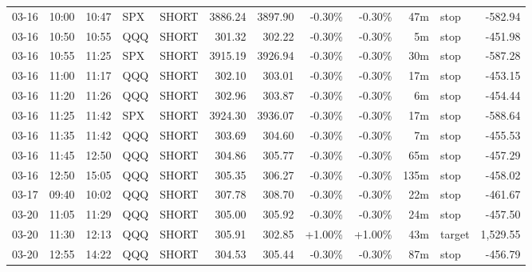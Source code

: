 \documentclass[11pt,a4paper,twoside]{article}
\begin{document}
\begin{center}
\begin{longtable}{>{\color{txtmain}}l l l l l r r r r r >{\color{txtmain}}l r}
03-16 & 10:00 & 10:47 & SPX & SHORT & 3886.24 & 3897.90 & \textcolor{lossred}{-0.30\%} & \textcolor{lossred}{-0.30\%} & 47m & stop & \textcolor{lossred}{-582.94} \\
03-16 & 10:50 & 10:55 & QQQ & SHORT & 301.32 & 302.22 & \textcolor{lossred}{-0.30\%} & \textcolor{lossred}{-0.30\%} & 5m & stop & \textcolor{lossred}{-451.98} \\
03-16 & 10:55 & 11:25 & SPX & SHORT & 3915.19 & 3926.94 & \textcolor{lossred}{-0.30\%} & \textcolor{lossred}{-0.30\%} & 30m & stop & \textcolor{lossred}{-587.28} \\
03-16 & 11:00 & 11:17 & QQQ & SHORT & 302.10 & 303.01 & \textcolor{lossred}{-0.30\%} & \textcolor{lossred}{-0.30\%} & 17m & stop & \textcolor{lossred}{-453.15} \\
03-16 & 11:20 & 11:26 & QQQ & SHORT & 302.96 & 303.87 & \textcolor{lossred}{-0.30\%} & \textcolor{lossred}{-0.30\%} & 6m & stop & \textcolor{lossred}{-454.44} \\
03-16 & 11:25 & 11:42 & SPX & SHORT & 3924.30 & 3936.07 & \textcolor{lossred}{-0.30\%} & \textcolor{lossred}{-0.30\%} & 17m & stop & \textcolor{lossred}{-588.64} \\
03-16 & 11:35 & 11:42 & QQQ & SHORT & 303.69 & 304.60 & \textcolor{lossred}{-0.30\%} & \textcolor{lossred}{-0.30\%} & 7m & stop & \textcolor{lossred}{-455.53} \\
03-16 & 11:45 & 12:50 & QQQ & SHORT & 304.86 & 305.77 & \textcolor{lossred}{-0.30\%} & \textcolor{lossred}{-0.30\%} & 65m & stop & \textcolor{lossred}{-457.29} \\
03-16 & 12:50 & 15:05 & QQQ & SHORT & 305.35 & 306.27 & \textcolor{lossred}{-0.30\%} & \textcolor{lossred}{-0.30\%} & 135m & stop & \textcolor{lossred}{-458.02} \\
03-17 & 09:40 & 10:02 & QQQ & SHORT & 307.78 & 308.70 & \textcolor{lossred}{-0.30\%} & \textcolor{lossred}{-0.30\%} & 22m & stop & \textcolor{lossred}{-461.67} \\
03-20 & 11:05 & 11:29 & QQQ & SHORT & 305.00 & 305.92 & \textcolor{lossred}{-0.30\%} & \textcolor{lossred}{-0.30\%} & 24m & stop & \textcolor{lossred}{-457.50} \\
03-20 & 11:30 & 12:13 & QQQ & SHORT & 305.91 & 302.85 & \textcolor{wingreen}{+1.00\%} & \textcolor{wingreen}{+1.00\%} & 43m & target & \textcolor{wingreen}{1,529.55} \\
03-20 & 12:55 & 14:22 & QQQ & SHORT & 304.53 & 305.44 & \textcolor{lossred}{-0.30\%} & \textcolor{lossred}{-0.30\%} & 87m & stop & \textcolor{lossred}{-456.79} \\

\end{longtable}
\end{center}
\end{document}
